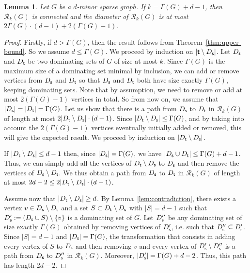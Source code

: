 \documentclass[10pt]{article}
\newtheorem{lemma}[theorem]{Lemma}
\newcommand{\source}{{\sf s}}
\newcommand{\target}{{\sf t}}
\begin{document}
\begin{lemma}\label{lem:minorUB}
Let $G$ be a $d$-minor sparse graph.
If $k=\Gamma(G)+d-1$, then $\mathcal{R}_k(G)$ is connected and the diameter of $\mathcal{R}_k(G)$ is at most $2\Gamma(G)\cdot(d-1)+2(\Gamma(G)-1)$.
\end{lemma}

\begin{proof}
Firstly, if $d > \Gamma(G)$, then the result follows from Theorem~\ref{thm:upper-bound}. So we assume $d \leq \Gamma(G)$. We proceed by induction on $|\target \setminus D_\source|$.
Let $D_\source$ and $D_\target$ be two dominating sets of $G$ of size at most $k$. Since $\Gamma(G)$ is the maximum size of a dominating set minimal by inclusion, we can add or remove vertices from $D_\source$ and $D_\target$ so that $D_\source$ and $D_\target$ both have size exactly $\Gamma(G)$, keeping dominating sets. Note that by assumption, we need to remove or add at most $2(\Gamma(G)-1)$ vertices in total. So from now on, we assume that $|D_\source| = |D_\target| = \Gamma(G)$. Let us show that there is a path from $D_\source$ to $D_\target$ in $\mathcal{R}_k(G)$ of length at most $2|D_\target \setminus D_\source|\cdot(d-1)$. Since $|D_\target \setminus D_\source|\leq \Gamma(G)$, and by taking into account the $2(\Gamma(G)-1)$ vertices eventually initially added or removed, this will give the expected result. We proceed by induction on $|D_\target \setminus D_\source|$.

If $|D_\target \setminus D_\source|\leq d-1$ then, since $|D_\source| = \Gamma(G)$, we have $|D_\source \cup D_\target|\leq \Gamma(G)+d-1$. Thus, we can simply add all the vertices of $D_\target \setminus D_\source$ to $D_\source$ and then remove the vertices of $D_\source \setminus D_\target$. We thus obtain a path from $D_\source$ to $D_\target$ in $\mathcal{R}_k(G)$ of length at most $2d-2\leq 2| D_\target \setminus D_\source|\cdot(d-1)$.

Assume now that $|D_\target \setminus D_\source|\geq d$. By Lemma~\ref{lem:contradiction}, there exists a vertex $v \in D_\source \setminus D_\target$ and a set $S \subset D_\target \setminus D_\source$ with $|S|=d-1$ such that $D_\source':= (D_\source \cup S) \setminus \{v\}$ is a dominating set of $G$. Let $D_\source''$ be any dominating set of size exactly $\Gamma(G)$ obtained by removing vertices of $D_\source'$, i.e. such that $D_\source'' \subseteq D_\source'$. Since $|S|=d-1$ and $|D_\source|=\Gamma(G)$, the transformation that consists in adding every vertex of $S$ to $D_\source$ and then removing $v$ and every vertex of $D_\source'\setminus D_\source''$ is a path from $D_\source$ to $D_\source''$ in $\mathcal{R}_k(G)$. Moreover, $|D_\source'|= \Gamma(G)+d-2$. Thus, this path has length $2d-2$.


\end{proof}
\end{document}
